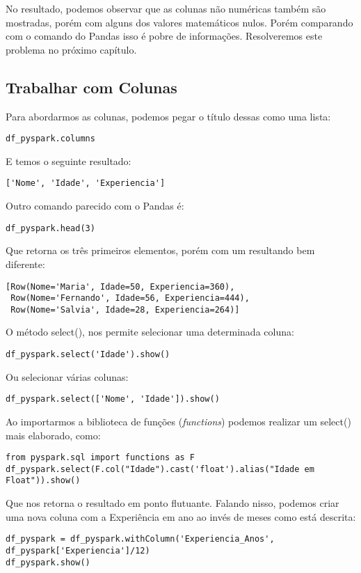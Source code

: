 No resultado, podemos observar que as colunas não numéricas também são mostradas, porém com alguns dos valores matemáticos nulos. Porém comparando com o comando do Pandas isso é pobre de informações. Resolveremos este problema no próximo capítulo.

\subsection{Trabalhar com Colunas}
Para abordarmos as colunas, podemos pegar o título dessas como uma lista:
\begin{lstlisting}[]
df_pyspark.columns
\end{lstlisting}

E temos o seguinte resultado: \vspace{-1.5em}
\begin{verbatim}
['Nome', 'Idade', 'Experiencia']
\end{verbatim}

Outro comando parecido com o Pandas é:
\begin{lstlisting}[]
df_pyspark.head(3)
\end{lstlisting}

Que retorna os três primeiros elementos, porém com um resultando bem diferente: \vspace{-1.5em}
\begin{verbatim}
[Row(Nome='Maria', Idade=50, Experiencia=360),
 Row(Nome='Fernando', Idade=56, Experiencia=444),
 Row(Nome='Salvia', Idade=28, Experiencia=264)]
\end{verbatim}

O método select(), nos permite selecionar uma determinada coluna:
\begin{lstlisting}[]
df_pyspark.select('Idade').show()
\end{lstlisting}

Ou selecionar várias colunas:
\begin{lstlisting}[]
df_pyspark.select(['Nome', 'Idade']).show()
\end{lstlisting}

Ao importarmos a biblioteca de funções (\textit{functions}) podemos realizar um select() mais elaborado, como:
\begin{lstlisting}[]
from pyspark.sql import functions as F
df_pyspark.select(F.col("Idade").cast('float').alias("Idade em Float")).show()
\end{lstlisting}

Que nos retorna o resultado em ponto flutuante. Falando nisso, podemos criar uma nova coluna com a Experiência em ano ao invés de meses como está descrita:
\begin{lstlisting}[]
df_pyspark = df_pyspark.withColumn('Experiencia_Anos', df_pyspark['Experiencia']/12)
df_pyspark.show()
\end{lstlisting}


